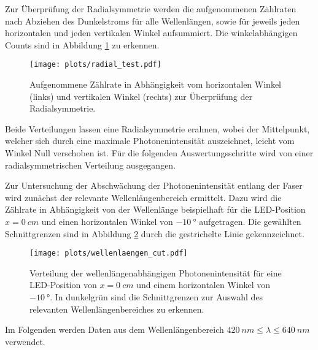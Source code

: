 Zur Überprüfung der Radialsymmetrie werden die aufgenommenen Zählraten nach Abziehen des Dunkelstroms für alle Wellenlängen, sowie für jeweils jeden horizontalen und jeden vertikalen Winkel aufsummiert. Die winkelabhängigen Counts sind in Abbildung \ref{fig:radial_test} zu erkennen. 
\begin{figure}
    \centering
    \texttt{[image: plots/radial\_test.pdf]}
    \caption{Aufgenommene Zählrate in Abhängigkeit vom horizontalen Winkel (links) und vertikalen Winkel (rechts) zur Überprüfung der Radialsymmetrie.}
    \label{fig:radial_test}
\end{figure}
\FloatBarrier
Beide Verteilungen lassen eine Radialsymmetrie erahnen, wobei der Mittelpunkt, welcher sich durch eine maximale Photonenintensität auszeichnet, leicht vom Winkel Null verschoben ist. Für die folgenden Auswertungsschritte wird von einer radialsymmetrischen Verteilung ausgegangen.


Zur Untersuchung der Abschwächung der Photonenintensität entlang der Faser wird zunächst der relevante Wellenlängenbereich ermittelt. Dazu wird die Zählrate in Abhängigkeit von der Wellenlänge beispielhaft für die LED-Position $x = \SI{0}{cm}$ und einen horizontalen Winkel von $\SI{-10}{°}$ aufgetragen. Die gewählten Schnittgrenzen sind in Abbildung \ref{fig:wellenlaengen_cut} durch die gestrichelte Linie gekennzeichnet.
\begin{figure}
    \centering
    \texttt{[image: plots/wellenlaengen\_cut.pdf]}
    \caption{Verteilung der wellenlängenabhängigen Photonenintensität für eine LED-Position von $x = \SI{0}{cm}$ und einem horizontalen Winkel von $\SI{-10}{°}$. In dunkelgrün sind die Schnittgrenzen zur Auswahl des relevanten Wellenlängenbereiches zu erkennen.}
    \label{fig:wellenlaengen_cut}
\end{figure}
\FloatBarrier
Im Folgenden werden Daten aus dem Wellenlängenbereich $\SI{420}{nm} \leq \lambda \leq \SI{640}{nm}$ verwendet.

